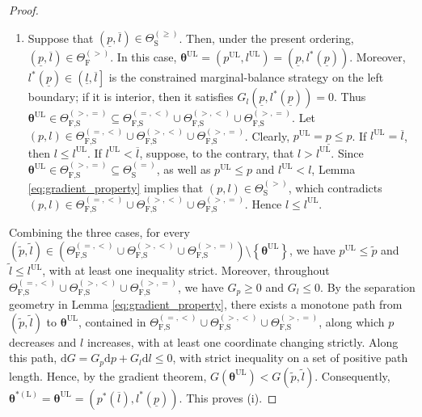 \documentclass[10pt,a4paper]{amsart}
\begin{document}
\begin{proof}
\begin{enumerate}
\item[(III)] Suppose that $\left(\underline{p},\overline{l}\right)\in\Theta_{\text{S}}^{\left(\geq\right)}$. Then, under the present ordering, $\left(\underline{p},\overline{l}\right)\in\Theta_{\text{F}}^{\left(>\right)}$. In this case, ${\bm\theta}^{\text{UL}}=\left(p^{\text{UL}},l^{\text{UL}}\right)=\left(\underline{p},l^*\left(\underline{p}\right)\right)$. Moreover, $l^*\left(\underline{p}\right)\in\left(\underline{l},\overline{l}\right]$ is the constrained marginal-balance strategy on the left boundary; if it is interior, then it satisfies $G_l\left(\underline{p},l^*\left(\underline{p}\right)\right)=0$. Thus ${\bm\theta}^{\text{UL}}\in\Theta_{\text{F,S}}^{\left(>,=\right)}\subseteq\Theta_{\text{F,S}}^{\left(=,<\right)}\cup\Theta_{\text{F,S}}^{\left(>,<\right)}\cup\Theta_{\text{F,S}}^{\left(>,=\right)}$. Let $\left(p,l\right)\in\Theta_{\text{F,S}}^{\left(=,<\right)}\cup\Theta_{\text{F,S}}^{\left(>,<\right)}\cup\Theta_{\text{F,S}}^{\left(>,=\right)}$. Clearly, $p^{\text{UL}}=\underline{p}\leq p$. If $l^{\text{UL}}=\overline{l}$, then $l\leq l^{\text{UL}}$. If $l^{\text{UL}}<\overline{l}$, suppose, to the contrary, that $l>l^{\text{UL}}$. Since ${\bm\theta}^{\text{UL}}\in\Theta_{\text{F,S}}^{\left(>,=\right)}\subseteq\Theta_{\text{S}}^{\left(=\right)}$, as well as $p^{\text{UL}}\leq p$ and $l^{\text{UL}}<l$, Lemma \ref{eq:gradient_property} implies that $\left(p,l\right)\in\Theta_{\text{S}}^{\left(>\right)}$, which contradicts $\left(p,l\right)\in\Theta_{\text{F,S}}^{\left(=,<\right)}\cup\Theta_{\text{F,S}}^{\left(>,<\right)}\cup\Theta_{\text{F,S}}^{\left(>,=\right)}$. Hence $l\leq l^{\text{UL}}$.
\end{enumerate}

Combining the three cases, for every $\left(\tilde{p},\tilde{l}\right)\in\left(\Theta_{\text{F,S}}^{\left(=,<\right)}\cup\Theta_{\text{F,S}}^{\left(>,<\right)}\cup\Theta_{\text{F,S}}^{\left(>,=\right)}\right)\setminus\left\{{\bm\theta}^{\text{UL}}\right\}$, we have $p^{\text{UL}}\leq\tilde{p}$ and $\tilde{l}\leq l^{\text{UL}}$, with at least one inequality strict. Moreover, throughout $\Theta_{\text{F,S}}^{\left(=,<\right)}\cup\Theta_{\text{F,S}}^{\left(>,<\right)}\cup\Theta_{\text{F,S}}^{\left(>,=\right)}$, we have $G_p\geq 0$ and $G_l\leq 0$. By the separation geometry in Lemma \ref{eq:gradient_property}, there exists a monotone path from $\left(\tilde{p},\tilde{l}\right)$ to ${\bm\theta}^{\text{UL}}$, contained in $\Theta_{\text{F,S}}^{\left(=,<\right)}\cup\Theta_{\text{F,S}}^{\left(>,<\right)}\cup\Theta_{\text{F,S}}^{\left(>,=\right)}$, along which $p$ decreases and $l$ increases, with at least one coordinate changing strictly. Along this path, $\text{d}G=G_p\text{d}p+G_l\text{d}l\leq 0$, with strict inequality on a set of positive path length. Hence, by the gradient theorem, $G\left({\bm\theta}^{\text{UL}}\right)<G\left(\tilde{p},\tilde{l}\right)$. Consequently, ${\bm\theta}^{*\left(\text{L}\right)}={\bm\theta}^{\text{UL}}=\left(p^*\left(\overline{l}\right),l^*\left(\underline{p}\right)\right)$. This proves (i).


\end{proof}
\end{document}
